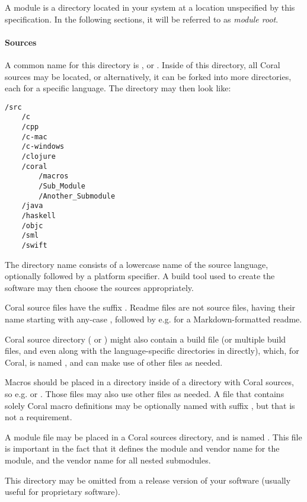 A module is a directory located in your system at a location unspecified by this specification. In the following sections, it will be referred to as {\em module root}. 

\paragraph{Sources}
A common name for this directory is , or . Inside of this directory, all Coral sources may be located, or alternatively, it can be forked into more directories, each for a specific language. The directory may then look like:
\begin{lstlisting}
/src
    /c
    /cpp
    /c-mac
    /c-windows
    /clojure
    /coral
        /macros
        /Sub_Module
        /Another_Submodule
    /java
    /haskell
    /objc
    /sml
    /swift
\end{lstlisting}

The directory name consists of a lowercase name of the source language, optionally followed by a platform specifier. A build tool used to create the software may then choose the sources appropriately. 

Coral source files have the suffix . Readme files are not source files, having their name starting with any-case , followed by e.g.  for a Markdown-formatted readme. 

Coral source directory ( or ) might also contain a build file (or multiple build files, and even along with the language-specific directories in  directly), which, for Coral, is named , and can make use of other files as needed. 

Macros should be placed in a  directory inside of a directory with Coral sources, so e.g.  or . Those files may also use other files as needed. A file that contains solely Coral macro definitions may be optionally named with suffix , but that is not a requirement. 

A module file may be placed in a Coral sources directory, and is named . This file is important in the fact that it defines the module and vendor name for the module, and the vendor name for all nested submodules. 

This directory may be omitted from a release version of your software (usually useful for proprietary software). 

